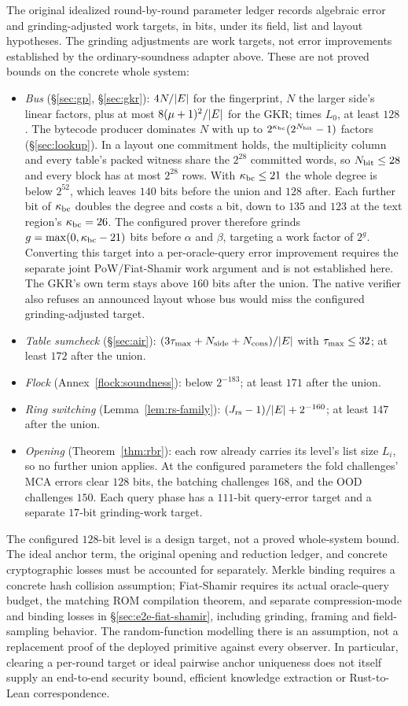 The original idealized round-by-round parameter ledger records algebraic error and grinding-adjusted work targets, in bits, under its field, list and layout hypotheses. The grinding adjustments are work targets, not error improvements established by the ordinary-soundness adapter above. These are not proved bounds on the concrete whole system:
\begin{itemize}[itemsep=1pt,topsep=3pt]
\item \emph{Bus} (\S\ref{sec:gp}, \S\ref{sec:gkr}): $4N/|E|$ for the fingerprint, $N$ the larger side's linear factors, plus at most $8(\mu+1)^2/|E|$ for the GKR; times $L_0$, at least $128$. The bytecode producer dominates $N$ with up to $2^{\kappa_{\mathrm{bc}}}(2^{N_{\mathrm{bit}}}-1)$ factors (\S\ref{sec:lookup}). In a layout one commitment holds, the multiplicity column and every table's packed witness share the $2^{28}$ committed words, so $N_{\mathrm{bit}}\le28$ and every block has at most $2^{28}$ rows. With $\kappa_{\mathrm{bc}}\le21$ the whole degree is below $2^{52}$, which leaves $140$ bits before the union and $128$ after. Each further bit of $\kappa_{\mathrm{bc}}$ doubles the degree and costs a bit, down to $135$ and $123$ at the text region's $\kappa_{\mathrm{bc}}=26$. The configured prover therefore grinds $g=\max(0,\kappa_{\mathrm{bc}}-21)$ bits before $\alpha$ and $\beta$, targeting a work factor of $2^g$. Converting this target into a per-oracle-query error improvement requires the separate joint PoW/Fiat-Shamir work argument and is not established here. The GKR's own term stays above $160$ bits after the union. The native verifier also refuses an announced layout whose bus would miss the configured grinding-adjusted target.
\item \emph{Table sumcheck} (\S\ref{sec:air}): $(3\tau_{\max}+N_{\mathrm{side}}+N_{\mathrm{cons}})/|E|$ with $\tau_{\max}\le32$; at least $172$ after the union.
\item \emph{Flock} (Annex~\ref{flock:soundness}): below $2^{-183}$; at least $171$ after the union.
\item \emph{Ring switching} (Lemma~\ref{lem:rs-family}): $(J_{\mathrm{rs}}-1)/|E|+2^{-160}$; at least $147$ after the union.
\item \emph{Opening} (Theorem~\ref{thm:rbr}): each row already carries its level's list size $L_i$, so no further union applies. At the configured parameters the fold challenges' MCA errors clear $128$ bits, the batching challenges $168$, and the OOD challenges $150$. Each query phase has a $111$-bit query-error target and a separate $17$-bit grinding-work target.
\end{itemize}
The configured $128$-bit level is a design target, not a proved whole-system bound. The ideal anchor term, the original opening and reduction ledger, and concrete cryptographic losses must be accounted for separately. Merkle binding requires a concrete hash collision assumption; Fiat-Shamir requires its actual oracle-query budget, the matching ROM compilation theorem, and separate compression-mode and binding losses in \S\ref{sec:e2e-fiat-shamir}, including grinding, framing and field-sampling behavior. The random-function modelling there is an assumption, not a replacement proof of the deployed primitive against every observer. In particular, clearing a per-round target or ideal pairwise anchor uniqueness does not itself supply an end-to-end security bound, efficient knowledge extraction or Rust-to-Lean correspondence.
